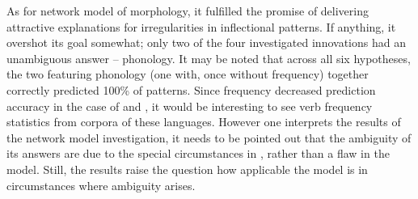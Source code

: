 
As for  network model of morphology, it fulfilled the promise of delivering attractive explanations for irregularities in inflectional patterns.
If anything, it overshot its goal somewhat; only two of the four investigated innovations had an unambiguous answer -- phonology.
It may be noted that across all six hypotheses, the two featuring phonology (one with, once without frequency) together correctly predicted 100\% of patterns.
Since frequency decreased prediction accuracy in the case of \carijo and \yukpa, it would be interesting to see  verb frequency statistics from corpora of these languages.
However one interprets the results of the network model investigation, it needs to be pointed out that the ambiguity of its answers are due to the special circumstances in \PC, rather than a flaw in the model.
Still, the results raise the question how applicable the model is in circumstances where ambiguity arises.

%
%

